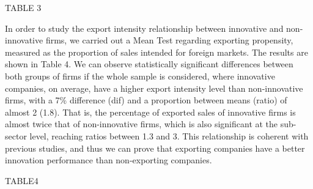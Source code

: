 TABLE 3

In order to study the export intensity relationship between innovative and non-innovative firms, we carried out a Mean Test regarding exporting propensity, measured as the proportion of sales intended for foreign markets. The results are shown in Table 4. We can observe statistically significant differences between both groups of firms if the whole sample is considered, where innovative companies, on average, have a higher export intensity level than non-innovative firms, with a 7\% difference (dif) and a proportion between means  (ratio) of almost 2 (1.8). That is, the percentage of exported sales of innovative firms is almost twice that of non-innovative firms, which is also significant at the sub-sector level, reaching ratios between 1.3 and 3. This relationship is coherent with previous studies, and thus we can prove that exporting companies have a better innovation performance than non-exporting companies. 

TABLE4






